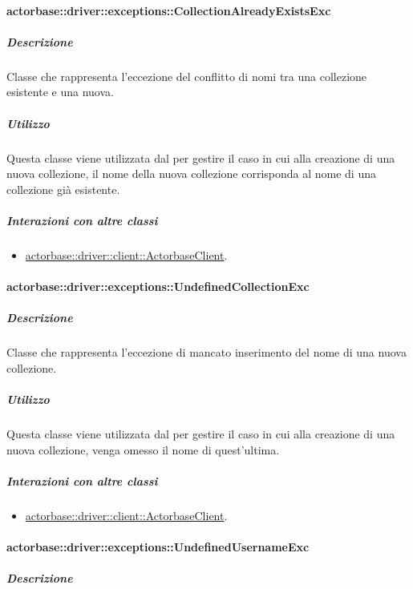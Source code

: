 \documentclass{scalatekids-article}
\begin{document}
\paragraph{actorbase::driver::exceptions::CollectionAlreadyExistsExc}

\subparagraph{Descrizione}

Classe che rappresenta l'eccezione del conflitto di nomi tra una collezione esistente e una nuova.

\subparagraph{Utilizzo}

Questa classe viene utilizzata dal  per gestire il caso in cui alla creazione di una nuova collezione, il nome della nuova collezione corrisponda al nome di una collezione già esistente.

\subparagraph{Interazioni con altre classi}

\begin{itemize}
\item \hyperref[sec:actorbase::driver::client::ActorbaseClient]{actorbase::driver::client::ActorbaseClient}.
\end{itemize}

\paragraph{actorbase::driver::exceptions::UndefinedCollectionExc}

\subparagraph{Descrizione}

Classe che rappresenta l'eccezione di mancato inserimento del nome di una nuova collezione.

\subparagraph{Utilizzo}

Questa classe viene utilizzata dal  per gestire il caso in cui alla creazione di una nuova collezione, venga omesso il nome di quest'ultima.

\subparagraph{Interazioni con altre classi}

\begin{itemize}
\item \hyperref[sec:actorbase::driver::client::ActorbaseClient]{actorbase::driver::client::ActorbaseClient}.
\end{itemize}

\paragraph{actorbase::driver::exceptions::UndefinedUsernameExc}

\subparagraph{Descrizione}
\end{document}
